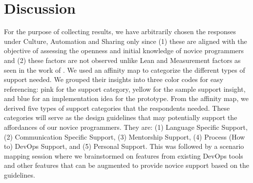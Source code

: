 \documentclass{sigchi}
\begin{document}
\section{Discussion}
For the purpose of collecting results, we have arbitrarily chosen the responses under Culture, Automation and Sharing only since (1) these are aligned with the objective of assessing the openness and initial knowledge of novice programmers and (2) these factors are not observed unlike Lean and Measurement factors as seen in the work of \cite{fronza2011understanding}. We used an affinity map to categorize the different types of support needed. %
We grouped their insights into three color codes for easy referencing: pink for the support category, yellow for the sample support insight, and blue for an implementation idea for the prototype. From the affinity map, we derived five types of support categories that the respondents needed. These categories will serve as the design guidelines that may potentially support the affordances of our novice programmers. They are: (1) Language Specific Support, (2) Communication Specific Support, (3) Mentorship Support, (4) Process (How to) DevOps Support, and (5) Personal Support. This was followed by a scenario mapping session where we brainstormed on features from existing DevOps tools and other features that can be augmented to provide novice support based on the guidelines. %
\end{document}
